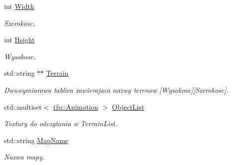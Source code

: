 \begin{DoxyCompactItemize}
\item 
\mbox{\label{classtfp_1_1_map_a38f784e3e3c4f02f86b161dd5f83a153}} 
int \mbox{\hyperlink{classtfp_1_1_map_a38f784e3e3c4f02f86b161dd5f83a153}{Width}}
\begin{DoxyCompactList}\small\item\em Szerokosc. \end{DoxyCompactList}\item 
\mbox{\label{classtfp_1_1_map_a4524a7be70f4b63b912a511f5b2af38c}} 
int \mbox{\hyperlink{classtfp_1_1_map_a4524a7be70f4b63b912a511f5b2af38c}{Height}}
\begin{DoxyCompactList}\small\item\em Wysokosc. \end{DoxyCompactList}\item 
\mbox{\label{classtfp_1_1_map_a663e663242a11d668b0ba6e0519ef5de}} 
std\+::string $\ast$$\ast$ \mbox{\hyperlink{classtfp_1_1_map_a663e663242a11d668b0ba6e0519ef5de}{Terrain}}
\begin{DoxyCompactList}\small\item\em Dwuwymiarowa tablica zawierajaca nazwy terenow \mbox{[}Wysokosc\mbox{]}\mbox{[}Szerokosc\mbox{]}. \end{DoxyCompactList}\item 
\mbox{\label{classtfp_1_1_map_adb9163e28f8b4d997d203619d04cb0d9}} 
std\+::multiset$<$ \mbox{\hyperlink{classtfp_1_1_animation}{tfp\+::\+Animation}} $>$ \mbox{\hyperlink{classtfp_1_1_map_adb9163e28f8b4d997d203619d04cb0d9}{Object\+List}}
\begin{DoxyCompactList}\small\item\em Textury do odczytania w Terrain\+List. \end{DoxyCompactList}\item 
\mbox{\label{classtfp_1_1_map_a0a22afd5614529f2e8d1f1fcc812233e}} 
std\+::string \mbox{\hyperlink{classtfp_1_1_map_a0a22afd5614529f2e8d1f1fcc812233e}{Map\+Name}}
\begin{DoxyCompactList}\small\item\em Nazwa mapy. \end{DoxyCompactList}\item 
$$
\end{DoxyCompactItemize}
